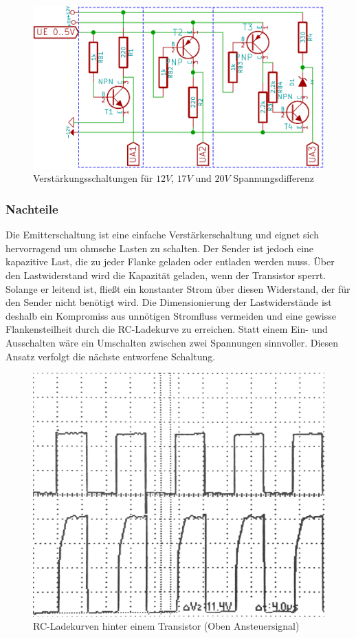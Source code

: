 \begin{figure}[H]
\centering
\includegraphics[scale=0.6]{images/transistorschaltungen.png}
\caption{Verstärkungsschaltungen für $12V$, $17V$ und $20V$ Spannungsdifferenz} \label{img:I3}
\end{figure}

\subsubsection{Nachteile}
Die Emitterschaltung ist eine einfache Verstärkerschaltung und eignet sich hervorragend um ohmsche Lasten zu schalten. Der Sender ist jedoch eine kapazitive Last, die zu jeder Flanke geladen oder entladen werden muss. Über den Lastwiderstand wird die Kapazität geladen, wenn der Transistor sperrt. Solange er leitend ist, fließt ein konstanter Strom über diesen Widerstand, der für den Sender nicht benötigt wird. Die Dimensionierung der Lastwiderstände ist deshalb ein Kompromiss aus unnötigen Stromfluss vermeiden und eine gewisse Flankensteilheit durch die RC-Ladekurve zu erreichen. Statt einem Ein- und Ausschalten wäre ein Umschalten zwischen zwei Spannungen sinnvoller. Diesen Ansatz verfolgt die nächste entworfene Schaltung.

\begin{figure}[H]
\centering
\includegraphics[width=(\textwidth)]{oszi/15-04-01/2.png}
\caption{RC-Ladekurven hinter einem Transistor (Oben Ansteuersignal)} \label{img:I4}
\end{figure}

